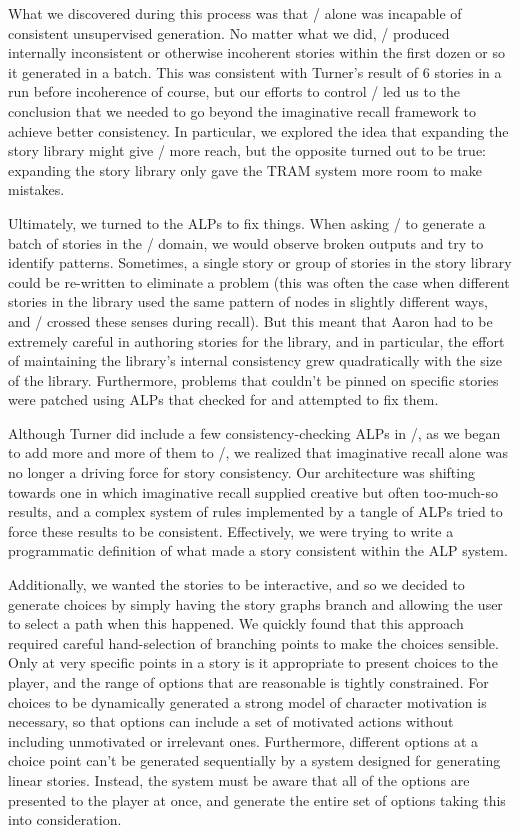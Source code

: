 What we discovered during this process was that \skald/ alone was incapable of consistent unsupervised generation.
%
No matter what we did, \skald/ produced internally inconsistent or otherwise incoherent stories within the first dozen or so it generated in a batch.
%
This was consistent with Turner's result of 6 stories in a run before incoherence of course, but our efforts to control \skald/ led us to the conclusion that we needed to go beyond the imaginative recall framework to achieve better consistency. 
%
In particular, we explored the idea that expanding the story library might give \skald/ more reach, but the opposite turned out to be true: expanding the story library only gave the TRAM system more room to make mistakes.


Ultimately, we turned to the ALPs to fix things.
%
When asking \skald/ to generate a batch of stories in the \problemplanets/ domain, we would observe broken outputs and try to identify patterns.
%
Sometimes, a single story or group of stories in the story library could be re-written to eliminate a problem (this was often the case when different stories in the library used the same pattern of nodes in slightly different ways, and \skald/ crossed these senses during recall).
%
But this meant that Aaron had to be extremely careful in authoring stories for the library, and in particular, the effort of maintaining the library's internal consistency grew quadratically with the size of the library.
%
Furthermore, problems that couldn't be pinned on specific stories were patched using ALPs that checked for and attempted to fix them.


Although Turner did include a few consistency-checking ALPs in \minstrel/, as we began to add more and more of them to \skald/, we realized that imaginative recall alone was no longer a driving force for story consistency.
%
Our architecture was shifting towards one in which imaginative recall supplied creative but often too-much-so results, and a complex system of rules implemented by a tangle of ALPs tried to force these results to be consistent.
%
Effectively, we were trying to write a programmatic definition of what made a story consistent within the ALP system.


Additionally, we wanted the stories to be interactive, and so we decided to generate choices by simply having the story graphs branch and allowing the user to select a path when this happened.
%
We quickly found that this approach required careful hand-selection of branching points to make the choices sensible.
%
Only at very specific points in a story is it appropriate to present choices to the player, and the range of options that are reasonable is tightly constrained.
%
For choices to be dynamically generated a strong model of character motivation is necessary, so that options can include a set of motivated actions without including unmotivated or irrelevant ones.
%
Furthermore, different options at a choice point can't be generated sequentially by a system designed for generating linear stories.
%
Instead, the system must be aware that all of the options are presented to the player at once, and generate the entire set of options taking this into consideration.


